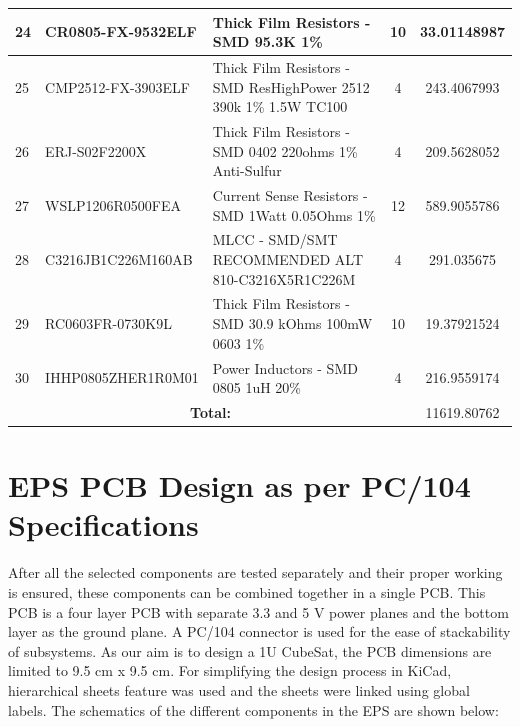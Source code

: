\begin{table}[ht]
{\begin{tabular}{|cclc|c|}
			\multicolumn{1}{|l|}{24} & \multicolumn{1}{l|}{CR0805-FX-9532ELF} & \multicolumn{1}{l|}{Thick Film Resistors   - SMD 95.3K 1\%} & 10 & 33.01148987 \\ \hline
			\multicolumn{1}{|l|}{25} & \multicolumn{1}{l|}{CMP2512-FX-3903ELF} & \multicolumn{1}{l|}{Thick Film Resistors   - SMD ResHighPower 2512 390k 1\% 1.5W TC100} & 4 & 243.4067993 \\ \hline
			\multicolumn{1}{|l|}{26} & \multicolumn{1}{l|}{ERJ-S02F2200X} & \multicolumn{1}{l|}{Thick Film Resistors   - SMD 0402 220ohms 1\% Anti-Sulfur} & 4 & 209.5628052 \\ \hline
			\multicolumn{1}{|l|}{27} & \multicolumn{1}{l|}{WSLP1206R0500FEA} & \multicolumn{1}{l|}{Current Sense   Resistors - SMD 1Watt 0.05Ohms 1\%} & 12 & 589.9055786 \\ \hline
			\multicolumn{1}{|l|}{28} & \multicolumn{1}{l|}{C3216JB1C226M160AB} & \multicolumn{1}{l|}{MLCC - SMD/SMT   RECOMMENDED ALT 810-C3216X5R1C226M} & 4 & 291.035675 \\ \hline
			\multicolumn{1}{|l|}{29} & \multicolumn{1}{l|}{RC0603FR-0730K9L} & \multicolumn{1}{l|}{Thick Film Resistors   - SMD 30.9 kOhms 100mW 0603 1\%} & 10 & 19.37921524 \\ \hline
			\multicolumn{1}{|l|}{30} & \multicolumn{1}{l|}{IHHP0805ZHER1R0M01} & \multicolumn{1}{l|}{Power Inductors - SMD   0805 1uH 20\%} & 4 & 216.9559174 \\ \hline
			\multicolumn{4}{|c|}{\bf{Total:}} & 11619.80762 \\ \hline
		\end{tabular}%
	}
\end{table}



\section{EPS PCB Design as per PC/104 Specifications}
  After all the selected components are tested separately and their proper working is ensured, these components can be combined together in a single PCB. This PCB is a four layer PCB with separate 3.3 and 5 V power planes and the bottom layer as the ground plane. A PC/104 connector is used for the ease of stackability of subsystems. As our aim is to design a 1U CubeSat, the PCB dimensions are limited to 9.5 cm x 9.5 cm. For simplifying the design process in KiCad, hierarchical sheets feature was used and the sheets were linked using global labels. The schematics of the different components in the EPS are shown below:

